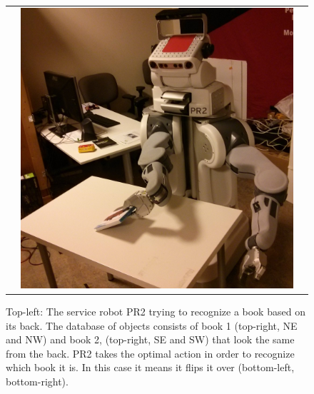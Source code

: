 \begin{figure}[ht]
\begin{tabular}{cccc}
    & \multicolumn{2}{c}{\includegraphics[width=0.45\columnwidth]{pics/pr2_rotate.jpg}}
    \end{tabular}
    \caption{Top-left: The service robot PR2 trying to recognize a book based on its back. The database of objects consists of book 1 (top-right, NE and NW) and book 2, (top-right, SE and SW) that look the same from the back. PR2 takes the optimal action in order to recognize which book it is. In this case it means it flips it over (bottom-left, bottom-right).}
    \vspace{-4ex}

    \label{fig:pr2}
    \end{figure}


